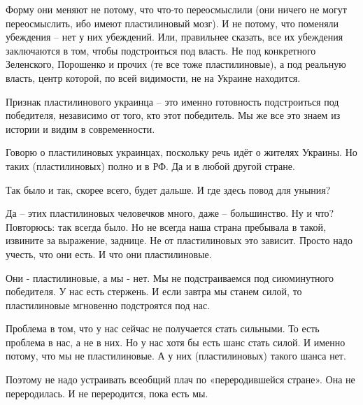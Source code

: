 Форму они меняют не потому, что что-то переосмыслили (они ничего не могут
переосмыслить, ибо имеют пластилиновый мозг). И не потому, что поменяли
убеждения – нет у них убеждений. Или, правильнее сказать, все их убеждения
заключаются в том, чтобы подстроиться под власть. Не под конкретного
Зеленского, Порошенко и прочих (те все тоже пластилиновые), а под реальную
власть, центр которой, по всей видимости, не на Украине находится.

Признак пластилинового украинца – это именно готовность подстроиться под
победителя, независимо от того, кто этот победитель. Мы же все это знаем из
истории и видим в современности. 

Говорю о пластилиновых украинцах, поскольку речь идёт о жителях Украины. Но
таких (пластилиновых) полно и в РФ. Да и в любой другой стране.

Так было и так, скорее всего, будет дальше. И где здесь повод для уныния?

Да – этих пластилиновых человечков много, даже – большинство. Ну и что?
Повторюсь: так всегда было. Но не всегда наша страна пребывала в такой,
извините за выражение, заднице. Не от пластилиновых это зависит. Просто надо
учесть, что они есть. И что они пластилиновые.

Они - пластилиновые, а мы - нет. Мы не подстраиваемся под сиюминутного
победителя. У нас есть стержень. И если завтра мы станем силой, то
пластилиновые мгновенно подстроятся под нас.

Проблема в том, что у нас сейчас не получается стать сильными. То есть проблема
в нас, а не в них. Но у нас хотя бы есть шанс стать силой. И именно потому, что
мы не пластилиновые. А у них (пластилиновых) такого шанса нет.

Поэтому не надо устраивать всеобщий плач по «переродившейся стране». Она не
переродилась. И не переродится, пока есть мы.


